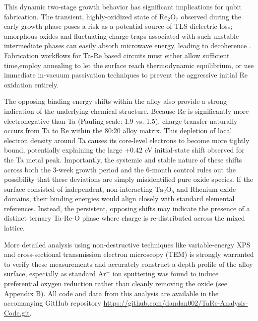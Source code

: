\documentclass[12pt]{article}
\begin{document}
This dynamic two-stage growth behavior has significant implications for qubit fabrication. The transient, highly-oxidized state of $\mathrm{Re_2O_7}$ observed during the early growth phase poses a risk as a potential source of TLS dielectric loss; amorphous oxides and fluctuating charge traps associated with such unstable intermediate phases can easily absorb microwave energy, leading to decoherence \cite{crowley2023, mclellan2023}. Fabrication workflows for Ta-Re based circuits must either allow sufficient time,employ annealing to let the surface reach thermodynamic equilibrium, or use immediate in-vacuum passivation techniques to prevent the aggressive initial Re oxidation entirely.

The opposing binding energy shifts within the alloy also provide a strong indication of the underlying chemical structure. Because Re is significantly more electronegative than Ta (Pauling scale: 1.9 vs. 1.5), charge transfer naturally occurs from Ta to Re within the 80:20 alloy matrix. This depletion of local electron density around Ta causes its core-level electrons to become more tightly bound, potentially explaining the large $+0.42$ eV initial-state shift observed for the Ta metal peak. Importantly, the systemic and stable nature of these shifts across both the 3-week growth period and the 6-month control rules out the possibility that these deviations are simply misidentified pure oxide species. If the surface consisted of independent, non-interacting $\mathrm{Ta_2O_5}$ and Rhenium oxide domains, their binding energies would align closely with standard elemental references. Instead, the persistent, opposing shifts may indicate the presence of a distinct ternary Ta-Re-O phase where charge is re-distributed across the mixed lattice.

More detailed analysis using non-destructive techniques like variable-energy XPS and cross-sectional transmission electron microscopy (TEM) is strongly warranted to verify these measurements and accurately construct a depth profile of the alloy surface, especially as standard Ar$^+$ ion sputtering was found to induce preferential oxygen reduction rather than cleanly removing the oxide (see Appendix B). All code and data from this analysis are available in the accomanying GitHub repository \url{https://github.com/dandan002/TaRe-Analysis-Code.git}.


\newpage
{}
\printbibliography

\newpage
{}
\end{document}
